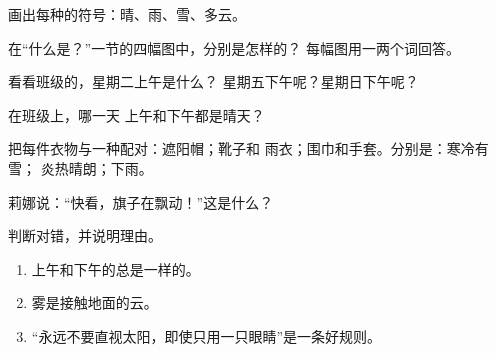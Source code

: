 \begin{exercise}[$\star$]\label{exo:g1:watching-the-weather:1}
画出每种的符号：晴、雨、雪、多云。
\end{exercise}

\begin{exercise}[$\star$]\label{exo:g1:watching-the-weather:2}
在“什么是？”一节的四幅图中，分别是怎样的？
每幅图用一两个词回答。
\end{exercise}

\begin{exercise}[$\star$]\label{exo:g1:watching-the-weather:3}
看看班级的，星期二上午是什么？
星期五下午呢？星期日下午呢？
\end{exercise}

\begin{exercise}[$\star$]\label{exo:g1:watching-the-weather:4}
在班级上，哪一天
上午和下午都是晴天？
\end{exercise}

\begin{exercise}[$\star$]\label{exo:g1:watching-the-weather:5}
把每件衣物与一种配对：遮阳帽；靴子和
雨衣；围巾和手套。分别是：寒冷有雪；
炎热晴朗；下雨。
\end{exercise}

\begin{exercise}[$\star$]\label{exo:g1:watching-the-weather:6}
莉娜说：“快看，旗子在飘动！”这是什么？
\end{exercise}

\begin{exercise}[$\star$]\label{exo:g1:watching-the-weather:7}
判断对错，并说明理由。
\begin{enumerate}
  \item 上午和下午的总是一样的。
  \item 雾是接触地面的云。
  \item “永远不要直视太阳，即使只用一只眼睛”是一条好规则。
\end{enumerate}
\end{exercise}

